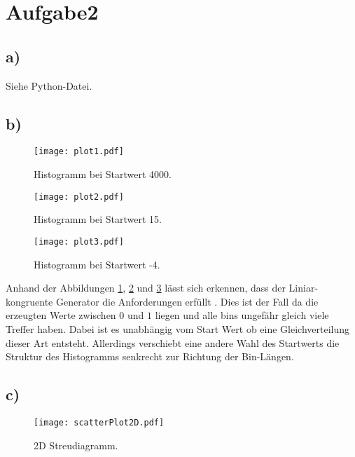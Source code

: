 \newpage
\section{Aufgabe2}
\label{sec:a2}



\subsection{a)}
\label{subsec:a2a}

Siehe Python-Datei.

\subsection{b)}
\label{subsec:a2b}

\FloatBarrier
\begin{figure}
  \centering
  \texttt{[image: plot1.pdf]}
  \caption{Histogramm bei Startwert 4000.}
  \label{fig:a2p1}
\end{figure}
\FloatBarrier

\FloatBarrier
\begin{figure}
  \centering
  \texttt{[image: plot2.pdf]}
  \caption{Histogramm bei Startwert 15.}
  \label{fig:a2p2}
\end{figure}
\FloatBarrier

\FloatBarrier
\begin{figure}
  \centering
  \texttt{[image: plot3.pdf]}
  \caption{Histogramm bei Startwert -4.}
  \label{fig:a2p3}
\end{figure}
\FloatBarrier
Anhand der Abbildungen \ref{fig:a2p1}, \ref{fig:a2p2} und \ref{fig:a2p3} lässt sich erkennen,
dass der Liniar-kongruente Generator die Anforderungen erfüllt . Dies ist der Fall da die erzeugten Werte zwischen $0$ und $1$ liegen und alle bins ungefähr gleich viele Treffer haben.
Dabei ist es unabhängig vom Start Wert ob eine Gleichverteilung dieser Art entsteht. Allerdings verschiebt eine andere Wahl des Startwerts die Struktur des Histogramms senkrecht zur
Richtung der Bin-Längen.

\subsection{c)}
\label{subsec:a2c}

\FloatBarrier
\begin{figure}
  \centering
  \texttt{[image: scatterPlot2D.pdf]}
  \caption{2D Streudiagramm.}
  \label{fig:a2p4}
\end{figure}
\FloatBarrier


